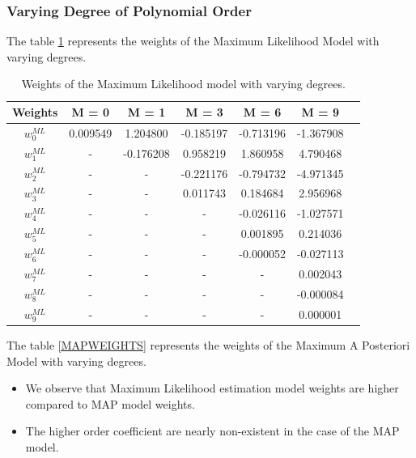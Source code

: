 \documentclass[12pt,twoside,a4paper]{article}
\begin{document}
\subsubsection{Varying Degree of Polynomial Order}
The table \ref{MLWEIGHTS} represents the weights of the Maximum Likelihood Model with varying degrees. 
\begin{table}[H]
\centering
\begin{tabular}{|c|c|c|c|c|c|c|}
\hline
\textbf{Weights}              & \textbf{M = 0} & \textbf{M = 1} & \textbf{M = 3} & \textbf{M = 6} & \textbf{M = 9} \\\hline
\textit{\textbf{$w_0^{ML}$}} & 0.009549       & 1.204800       & -0.185197      & -0.713196      & -1.367908      \\\hline
\textit{\textbf{$w_1^{ML}$}}  & -              & -0.176208      & 0.958219       & 1.860958       & 4.790468       \\\hline
\textit{\textbf{$w_2^{ML}$}} & - & - & -0.221176 & -0.794732 & -4.971345 \\\hline
\textit{\textbf{$w_3^{ML}$}} & - & - & 0.011743  & 0.184684  & 2.956968  \\\hline
\textit{\textbf{$w_4^{ML}$}} & - & - & -         & -0.026116 & -1.027571 \\\hline
\textit{\textbf{$w_5^{ML}$}} & - & - & -         & 0.001895  & 0.214036  \\\hline
\textit{\textbf{$w_6^{ML}$}} & - & - & -         & -0.000052 & -0.027113 \\\hline
\textit{\textbf{$w_7^{ML}$}} & - & - & -         & -         & 0.002043  \\\hline
\textit{\textbf{$w_8^{ML}$}} & - & - & -         & -         & -0.000084 \\\hline
\textit{\textbf{$w_9^{ML}$}} & - & - & -         & -         & 0.000001 \\\hline
\end{tabular}
\caption{Weights of the Maximum Likelihood model with varying degrees.}
\label{MLWEIGHTS}
\end{table}

The table \ref{MAPWEIGHTS} represents the weights of the Maximum A Posteriori Model with varying degrees.
\begin{itemize}
    \item We observe that Maximum Likelihood estimation model weights are higher compared to MAP model weights.
    \item The higher order coefficient are nearly non-existent in the case of the MAP model.
\end{itemize}
\end{document}
